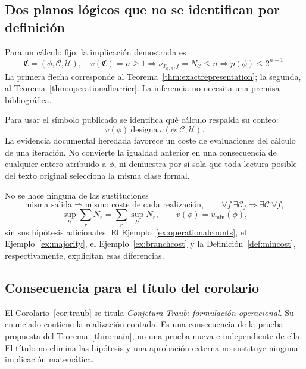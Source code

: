 \documentclass[11pt,a4paper]{article}
\numberwithin{equation}{section}
\theoremstyle{definition}
\theoremstyle{remark}
\begin{document}
\subsection{Dos planos lógicos que no se identifican por definición}
Para un cálculo fijo, la implicación demostrada es
\[
\mathfrak C=(\phi,\mathscr C,\mathcal U),\quad v(\mathfrak C)=n\ge1
\Longrightarrow\nu_{T_{\mathscr C,n},f}=N_{\mathscr C}\le n
\Longrightarrow p(\phi)\le2^{n-1}.
\]
La primera flecha corresponde al Teorema~\ref{thm:exactrepresentation}; la segunda, al Teorema~\ref{thm:operationalbarrier}. La inferencia no necesita una premisa bibliográfica.

Para usar el símbolo publicado se identifica qué cálculo respalda su conteo:
\[
v(\phi)\ \text{designa}\ v(\phi;\mathscr C,\mathcal U).
\]
La evidencia documental heredada favorece un coste de evaluaciones del cálculo de una iteración. No convierte la igualdad anterior en una consecuencia de cualquier entero atribuido a $\phi$, ni demuestra por sí sola que toda lectura posible del texto original selecciona la misma clase formal.

No se hace ninguna de las sustituciones
\[
\text{misma salida}\Rightarrow\text{mismo coste de cada realización},
\qquad
\forall f\ \exists\mathscr C_f\Rightarrow\exists\mathscr C\ \forall f,
\]
\[
\sup_{\mathcal U}\sum_rN_r=\sum_r\sup_{\mathcal U}N_r,
\qquad
v(\phi)=v_{\min}(\phi),
\]
sin sus hipótesis adicionales. El Ejemplo~\ref{ex:operationalcounts}, el Ejemplo~\ref{ex:majority}, el Ejemplo~\ref{ex:branchcost} y la Definición~\ref{def:mincost}, respectivamente, explicitan esas diferencias.

\subsection{Consecuencia para el título del corolario}
El Corolario~\ref{cor:traub} se titula \emph{Conjetura Traub: formulación operacional}. Su enunciado contiene la realización contada. Es una consecuencia de la prueba propuesta del Teorema~\ref{thm:main}, no una prueba nueva e independiente de ella. El título no elimina las hipótesis y una aprobación externa no sustituye ninguna implicación matemática.
\end{document}
